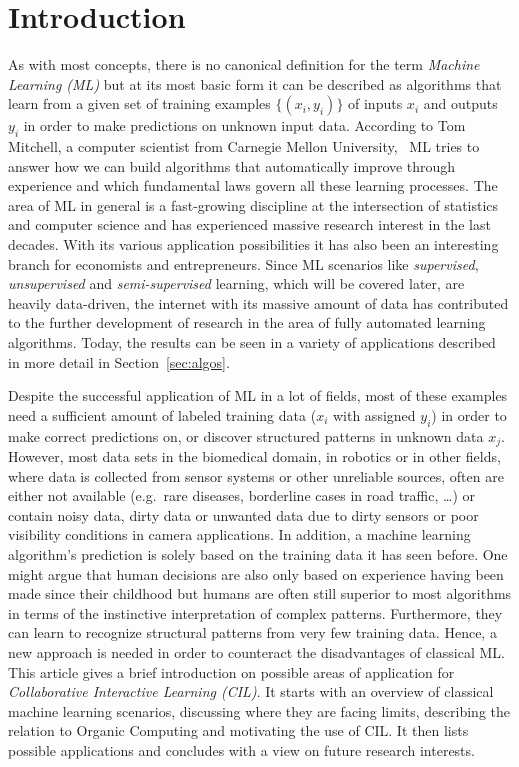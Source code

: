 \documentclass[conference]{IEEEtran}
\begin{document}
\section{Introduction}\label{sec:intro}
As with most concepts, there is no canonical 
definition for the term \textit{Machine Learning (ML)} but at its most basic form it 
can be described as algorithms that learn from a given set of training examples 
$\{(x_i, y_i)\}$ of inputs $x_i$ and outputs $y_i$ in order to 
make predictions on unknown input data. According to Tom 
Mitchell, a computer scientist from Carnegie Mellon University,  ML tries 
to answer how we can build algorithms that automatically improve through 
experience and which fundamental laws govern all these learning processes\cite{ML:mitchell}.
The area of ML in general is a fast-growing discipline at the intersection of statistics 
and computer science and has experienced massive research interest in the last decades.
With its various application possibilities it has also been an interesting branch for 
economists and entrepreneurs.
Since ML scenarios like \textit{supervised}, \textit{unsupervised} and 
\textit{semi-supervised} learning, which will be covered later, are heavily data-driven, 
the internet with its massive amount of data has contributed to the further development 
of research in the area of fully automated learning algorithms. Today, the results can 
be seen in a variety of applications\cite{FoundationsOfML:mohri}\cite{DisciplineOfML:mitchell} 
described in more detail in Section~\ref{sec:algos}.


Despite the successful application of ML in a lot of fields, most of these examples 
need a sufficient amount of labeled training data ($x_i$ with assigned $y_i$) in order to make 
correct predictions on, or discover structured patterns in unknown data $x_j$. However, most 
data sets in the biomedical domain, in robotics or in other fields, where data is collected 
from sensor systems or other unreliable sources, often are either not available (e.g.\ rare 
diseases, borderline cases in road traffic, \dots) or contain noisy data, dirty data or unwanted 
data due to dirty sensors or poor visibility conditions in camera applications.
In addition, a machine learning algorithm's prediction is solely based on the training data it 
has seen before. One might argue that human decisions are also only based on experience having been
made since their childhood but humans are often still superior to most algorithms in terms of 
the instinctive interpretation of complex patterns. Furthermore, they can learn to recognize 
structural patterns from very few training data. Hence, a new approach is needed in order to 
counteract the disadvantages of classical ML\@.
This article gives a brief introduction on possible areas of application for 
\textit{Collaborative Interactive Learning (CIL)}. It starts with an overview of classical 
machine learning scenarios, discussing where they are facing limits, describing the relation 
to Organic Computing and motivating the use of CIL\@. It then lists possible applications 
and concludes with a view on future research interests.
\end{document}
